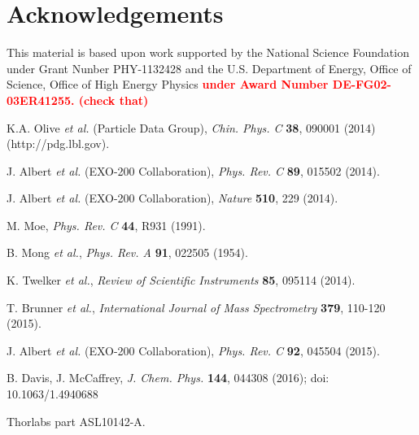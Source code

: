 \documentclass[aps,pra,reprint,superscriptaddress]{revtex4-1}
\begin{document}
\section*{Acknowledgements}

This material is based upon work supported by the National Science Foundation under Grant Nunber PHY-1132428 and the U.S. Department of Energy, Office of Science, Office of High Energy Physics \textbf{\textcolor{red}{under Award Number DE-FG02-03ER41255. (check that)}}

%
\begin{thebibliography}{00}
  K.A. Olive \emph{et al.} (Particle Data Group), \emph{Chin. Phys. C} \textbf{38}, 090001 (2014) (http://pdg.lbl.gov).


 J. Albert \emph{et al.} (EXO-200 Collaboration), \emph{Phys. Rev. C} \textbf{89}, 015502 (2014).

 J. Albert \emph{et al.} (EXO-200 Collaboration), \emph{Nature} \textbf{510}, 229 (2014).

 M. Moe, \emph{Phys. Rev. C} \textbf{44}, R931 (1991).

 B. Mong \emph{ et al.}, \emph{Phys. Rev. A} \textbf{91}, 022505 (1954).

 K. Twelker \emph{ et al.}, \emph{Review of Scientific Instruments} \textbf{85}, 095114 (2014).

 T. Brunner \emph{ et al.}, \emph{International Journal of Mass Spectrometry} \textbf{379}, 110-120 (2015).

 J. Albert \emph{et al.} (EXO-200 Collaboration), \emph{Phys. Rev. C} \textbf{92}, 045504 (2015).

 B. Davis, J. McCaffrey, \emph{J. Chem. Phys.} \textbf{144}, 044308 (2016); doi: 10.1063/1.4940688

 Thorlabs part ASL10142-A.
\end{thebibliography}
\end{document}
